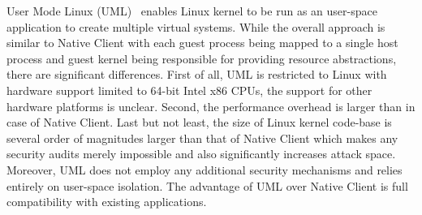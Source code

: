 
User Mode Linux (UML)~\cite{dike:uml06} enables Linux kernel to be run as
an user-space application to create multiple virtual systems. While the
overall approach is similar to Native Client with each guest process being
mapped to a single host process and guest kernel being responsible for
providing resource abstractions, there are significant differences.
First of all, UML is restricted to Linux with hardware support limited
to 64-bit Intel x86 CPUs, the support for other hardware platforms is
unclear. Second, the performance overhead is larger than in case of
Native Client. Last but not least, the size of Linux kernel code-base is
several order of magnitudes larger than that of Native Client which
makes any security audits merely impossible and also significantly
increases attack space. Moreover, UML does not employ any additional
security mechanisms and relies entirely on user-space isolation. The
advantage of UML over Native Client is full compatibility with existing
applications.

\cite{heiser:hotos11}
\cite{tanenbaum:osdi08}
\cite{engler:sosp95}
\cite{yee:ieee-sp09}
\cite{sehr:usenix-sec10}
\cite{ansel:pldi11}
\cite{donovan:pnacl10}
